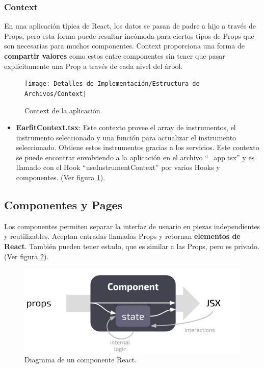 \documentclass[12pt,twoside,titlepage]{report}
\begin{document}
\subsubsection{Context}

En una aplicación típica de React, los datos se pasan de padre a hijo a través de Props, pero esta forma puede resultar incómoda para ciertos tipos de Props que son necesarias para muchos componentes. Context proporciona una forma de \textbf{compartir valores} como estos entre componentes sin tener que pasar explícitamente una Prop a través de cada nivel del árbol.

\begin{figure}[H]
    \centering
    \texttt{[image: Detalles de Implementación/Estructura de Archivos/Context]}
    \caption{Context de la aplicación.}
    \label{fig:Context}
\end{figure}

\begin{itemize}
    \item \textbf{EarfitContext.tsx}: Este contexto provee el array de instrumentos, el instrumento seleccionado y una función para actualizar el instrumento seleccionado. Obtiene estos instrumentos gracias a los servicios.    
    Este contexto se puede encontrar envolviendo a la aplicación en el archivo ``\_app.tsx'' y es llamado con el Hook ``useInstrumentContext'' por varios Hooks y componentes.
    (Ver figura \ref{fig:Context}).       
\end{itemize}

\subsection{Componentes y Pages}

Los componentes permiten separar la interfaz de usuario en piezas independientes y reutilizables. Aceptan entradas llamadas Props y retornan \textbf{elementos de React}. También pueden tener estado, que es similar a las Props, pero es privado.
(Ver figura \ref{fig:ReactComponent}).

\begin{figure}[H]
    \centering
    \includegraphics[scale=0.3]{React/ReactComponent}
    \caption{Diagrama de un componente React.}
    \label{fig:ReactComponent}
\end{figure}
\end{document}

